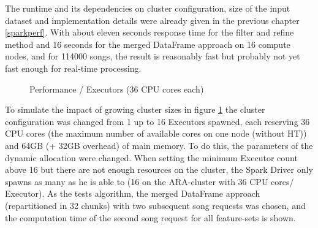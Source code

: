 The runtime and its dependencies on cluster configuration, size of the input dataset and implementation details were already given in the previous chapter \ref{sparkperf}. With about eleven seconds response time for the filter and refine method and 16 seconds for the merged DataFrame approach on 16 compute nodes, and for 114000 songs, the result is reasonably fast but probably not yet fast enough for real-time processing.\\ 

\FloatBarrier
\begin{figure}[htbp]
   	\centering
   	\caption{Performance / Executors (36 CPU cores each)}
   	\label{perfspark6}
\end{figure}
\FloatBarrier

\noindent To simulate the impact of growing cluster sizes in figure \ref{perfspark6} the cluster configuration was changed from 1 up to 16 Executors spawned, each reserving 36 CPU cores (the maximum number of available cores on one node (without HT)) and 64GB (+ 32GB overhead) of main memory. To do this, the parameters of the dynamic allocation were changed. When setting the minimum Executor count above 16 but there are not enough resources on the cluster, the Spark Driver only spawns as many as he is able to (16 on the ARA-cluster with 36 CPU cores/ Executor). As the tests algorithm, the merged DataFrame approach (repartitioned in 32 chunks) with two subsequent song requests was chosen, and the computation time of the second song request for all feature-sets is shown.\\

